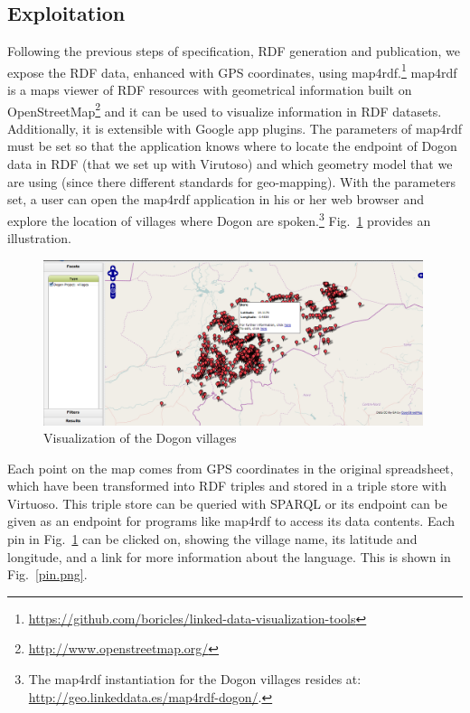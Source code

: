 \subsection{Exploitation}
Following the previous steps of specification, RDF generation and publication, we expose the RDF data, enhanced with GPS coordinates, using map4rdf.\footnote{\url{https://github.com/boricles/linked-data-visualization-tools}} map4rdf is a maps viewer of RDF resources with geometrical information built on OpenStreetMap\footnote{\url{http://www.openstreetmap.org/}} and it can be used to visualize information in RDF datasets. Additionally, it is extensible with Google app plugins. The parameters of map4rdf must be set so that the application knows where to locate the endpoint of Dogon data in RDF (that we set up with Virutoso) and which geometry model that we are using (since there different standards for geo-mapping). With the parameters set, a user can open the map4rdf application in his or her web browser and explore the location of villages where Dogon are spoken.\footnote{The map4rdf instantiation for the Dogon villages resides at: \url{http://geo.linkeddata.es/map4rdf-dogon/}.} Fig.\ \ref{fig:map4rdf} provides an illustration.

\begin{figure}[htb!p]
\centering
\includegraphics[width=0.99\textwidth]{img/map4rdf.png}
\caption{Visualization of the Dogon villages}
\label{fig:map4rdf}
\end{figure}

Each point on the map comes from GPS coordinates in the original spreadsheet, which have been transformed into RDF triples and stored in a triple store with Virtuoso. This triple store can be queried with SPARQL or its endpoint can be given as an endpoint for programs like map4rdf to access its data contents.  Each pin in Fig.\ \ref{fig:map4rdf} can be clicked on, showing the village name, its latitude and longitude, and a link for more information about the language. This is shown in Fig.\ \ref{pin.png}.

